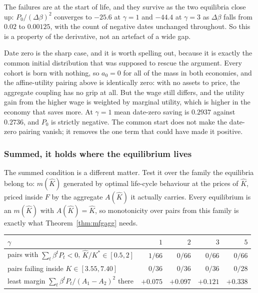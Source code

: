 The failures are at the start of life, and they survive as the two equilibria close up:
$P_0/(\Delta\beta)^2$ converges to $-25.6$ at $\gamma=1$ and $-44.4$ at $\gamma=3$ as
$\Delta\beta$ falls from $0.02$ to $0.00125$, with the count of negative dates unchanged
throughout. So this is a property of the derivative, not an artefact of a wide gap.

Date zero is the sharp case, and it is worth spelling out, because it is exactly the common
initial distribution that was supposed to rescue the argument. Every cohort is born with nothing,
so $a_0=0$ for all of the mass in both economies, and the affine-utility pairing above is
identically zero: with no assets to price, the aggregate coupling has no grip at all. But the wage
still differs, and the utility gain from the higher wage is weighted by marginal utility, which is
higher in the economy that saves more. At $\gamma=1$ mean date-zero saving is $0.2937$ against
$0.2736$, and $P_0$ is strictly negative. The common start does not make the date-zero pairing
vanish; it removes the one term that could have made it positive.

\subsubsection*{Summed, it holds where the equilibrium lives}

The summed condition is a different matter. Test it over the family the equilibria belong to:
$m(\hat K)$ generated by optimal life-cycle behaviour at the prices of $\hat K$, priced inside $F$
by the aggregate $A(\hat K)$ it actually carries. Every equilibrium is an $m(\hat K)$ with
$A(\hat K)=\hat K$, so monotonicity over pairs from this family is exactly what
Theorem~\ref{thm:mfgagg} needs.

\begin{center}
\begin{tabular}{lrrrr}
\toprule
$\gamma$ & $1$ & $2$ & $3$ & $5$\\
\midrule
pairs with $\sum_t\beta^tP_t<0$, $\hat K/K^*\in[0.5,2]$ & $1/66$ & $0/66$ & $0/66$ & $0/66$\\
pairs failing inside $K\in[3.55,7.40]$ & $0/36$ & $0/36$ & $0/36$ & $0/28$\\
least margin $\sum_t\beta^tP_t/(A_1-A_2)^2$ there & $+0.075$ & $+0.097$ & $+0.121$ & $+0.338$\\
\bottomrule
\end{tabular}
\end{center}

